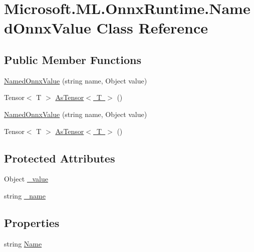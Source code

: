 \hypertarget{classMicrosoft_1_1ML_1_1OnnxRuntime_1_1NamedOnnxValue}{}\section{Microsoft.\+M\+L.\+Onnx\+Runtime.\+Named\+Onnx\+Value Class Reference}
\label{classMicrosoft_1_1ML_1_1OnnxRuntime_1_1NamedOnnxValue}
\subsection*{Public Member Functions}
\begin{DoxyCompactItemize}
\item 
\mbox{\hyperlink{classMicrosoft_1_1ML_1_1OnnxRuntime_1_1NamedOnnxValue_a62f08fabd9f3f9e4bb795f6f5f7e94a6}{Named\+Onnx\+Value}} (string name, Object value)
\item 
Tensor$<$ T $>$ \mbox{\hyperlink{classMicrosoft_1_1ML_1_1OnnxRuntime_1_1NamedOnnxValue_acbbc2b7be258596224bbc794ed983d46}{As\+Tensor$<$ T $>$}} ()
\item 
\mbox{\hyperlink{classMicrosoft_1_1ML_1_1OnnxRuntime_1_1NamedOnnxValue_a62f08fabd9f3f9e4bb795f6f5f7e94a6}{Named\+Onnx\+Value}} (string name, Object value)
\item 
Tensor$<$ T $>$ \mbox{\hyperlink{classMicrosoft_1_1ML_1_1OnnxRuntime_1_1NamedOnnxValue_acbbc2b7be258596224bbc794ed983d46}{As\+Tensor$<$ T $>$}} ()
\end{DoxyCompactItemize}
\subsection*{Protected Attributes}
\begin{DoxyCompactItemize}
\item 
Object \mbox{\hyperlink{classMicrosoft_1_1ML_1_1OnnxRuntime_1_1NamedOnnxValue_ad437385a514a76bd275b59d7ac095d65}{\+\_\+value}}
\item 
string \mbox{\hyperlink{classMicrosoft_1_1ML_1_1OnnxRuntime_1_1NamedOnnxValue_a0bbb3ebc95894dea3f5f9e80a9f8342e}{\+\_\+name}}
\end{DoxyCompactItemize}
\subsection*{Properties}
\begin{DoxyCompactItemize}
\item 
string \mbox{\hyperlink{classMicrosoft_1_1ML_1_1OnnxRuntime_1_1NamedOnnxValue_a07792a567f725cb21fa346ef69ea302f}{Name}}
\end{DoxyCompactItemize}


